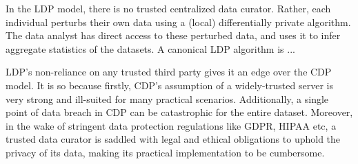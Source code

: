 
In the LDP model, there is no trusted centralized data curator. Rather, each individual perturbs their own data using a (local) differentially private algorithm. The data analyst has direct access to these perturbed data, and uses it to infer aggregate statistics of the datasets. A canonical LDP algorithm is ...  


 \par  \textsf{LDP}'s non-reliance on any trusted third party  gives it an edge over the \textsf{CDP} model. It is so because firstly, \textsf{CDP}'s assumption of a widely-trusted server is very strong and ill-suited for many practical scenarios. Additionally, a single point of data breach in \textsf{CDP} can be catastrophic for the entire dataset. Moreover, in the wake of stringent data protection regulations like \textsf{GDPR}, \textsf{HIPAA} etc, a trusted data curator is saddled with legal and ethical obligations to uphold the privacy of its data, making its practical implementation to be cumbersome.
  
